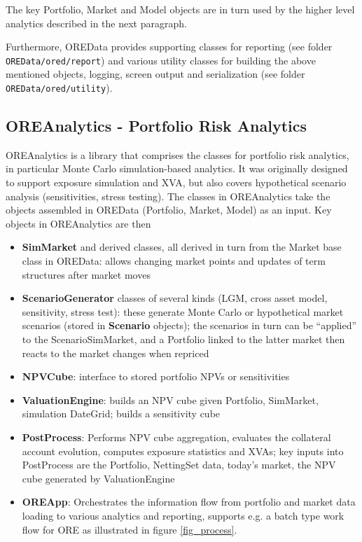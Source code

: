 \documentclass[12pt, a4paper]{report}
\begin{document}
The key Portfolio, Market and Model objects are in turn used by the higher level analytics described in the next paragraph.

Furthermore, OREData provides supporting classes for reporting (see folder {\tt OREData/ored/report}) and various utility classes for building the above mentioned objects, logging, screen output and serialization (see folder {\tt OREData/ored/utility}).

\subsection*{OREAnalytics - Portfolio Risk Analytics}

OREAnalytics is a library that comprises the classes for portfolio risk analytics, in particular Monte Carlo simulation-based analytics. It was originally designed to support exposure simulation and XVA, but also covers hypothetical scenario analysis
(sensitivities, stress testing). The classes in OREAnalytics take the objects assembled in OREData (Portfolio, Market, Model) as an input. Key objects in OREAnalytics are then
\begin{itemize}
\item {\bf SimMarket} and derived classes, all derived in turn from the Market base class in OREData: allows changing market points and updates of term structures after market moves
\item {\bf ScenarioGenerator} classes of several kinds (LGM, cross asset model, sensitivity, stress test): these generate Monte Carlo or hypothetical market scenarios (stored in {\bf Scenario} objects);
the scenarios in turn can be ``applied'' to the ScenarioSimMarket, and a Portfolio linked to the latter market then reacts to the market changes when repriced
\item {\bf NPVCube}: interface to stored portfolio NPVs or sensitivities
\item {\bf ValuationEngine}: builds an NPV cube given Portfolio, SimMarket, simulation DateGrid; builds a sensitivity cube
\item {\bf PostProcess}: Performs NPV cube aggregation, evaluates the collateral account evolution, computes exposure statistics and XVAs; key inputs into PostProcess are the Portfolio, NettingSet data, today's market, the NPV cube generated by ValuationEngine
\item {\bf OREApp}: Orchestrates the information flow from portfolio and market data loading to various analytics and reporting, supports e.g. a batch type work flow for ORE as illustrated in figure \ref{fig_process}.
\end{itemize}
\end{document}
